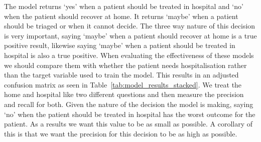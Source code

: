 The model returns `yes' when a patient should be treated in hospital and `no'
when the patient should recover at home. It returns `maybe' when a patient should
be triaged or when it cannot decide. The three way nature of this decision is very
important, saying `maybe' when a patient should recover at home is a true positive
result, likewise saying `maybe' when a patient should be treated in hospital is also 
a true positive. When evaluating the effectiveness of these models we should compare
them with whether the patient needs hospitalisation rather than the target variable
used to train the model. This results in an adjusted confusion matrix as seen in Table~\ref{tab:model_results_stacked}. We treat the home and hospital like two different 
questions and then measure the precision and recall for both. Given the nature of
the decision the model is making, saying `no' when the patient should be treated in
hospital has the worst outcome for the patient. As a results we want this value
to be as small as possible. A corollary of this is that we want the precision
for this decision to be as high as possible.

